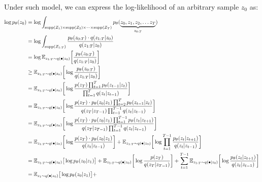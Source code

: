 Under such model, we can express the log-likelihood of an arbitrary sample \( z_0 \) as:
\begin{align}
    \log p_\theta (z_0) &= \log \int_{\supp{Z_1} \times \supp{Z_2} \times \dots \times \supp{Z_T}} p_\theta(\underbrace{z_0, z_1, z_2, \dots z_T}_{z_{0:T}}) \\
    &= \log \int_{\supp{Z_{1:T}}} \frac{p_\theta(z_{0:T}) \cdot q(z_{1:T} \vert z_0)}{q(z_{1:T} \vert z_0)} \label{eq:diffusion-1} \\
    &= \log \mathbb{E}_{z_{1:T} \sim q(\bullet \vert z_0)} \bigg[ \frac{p_\theta(z_{0:T})}{q(z_{1:T} \vert z_0)} \bigg] \\
    &\geq \mathbb{E}_{z_{1:T} \sim q(\bullet \vert z_0)} \bigg[ \log \frac{p_\theta(z_{0:T})}{q(z_{1:T} \vert z_0)} \bigg] \label{eq:diffusion-jensen} \\
    &= \mathbb{E}_{z_{1:T} \sim q(\bullet \vert z_0)} \bigg[ \log \frac{p(z_T) \prod_{t=1}^{T} p_\theta (z_{t-1} \vert z_t)}{\prod_{t=1}^T q(z_t \vert z_{t-1})} \bigg] \label{eq:diffusion-2} \\
    &= \mathbb{E}_{z_{1:T} \sim q(\bullet \vert z_0)} \bigg[ \log \frac{p(z_T) \cdot p_\theta (z_0 \vert z_1) \prod_{t=2}^{T} p_\theta (z_{t-1} \vert z_t)}{q(z_T \vert z_{T-1}) \prod_{t=1}^{T-1} q(z_t \vert z_{t-1})} \bigg] \label{eq:diffusion-3} \\
    &= \mathbb{E}_{z_{1:T} \sim q(\bullet \vert z_0)} \bigg[ \log \frac{p(z_T) \cdot p_\theta (z_0 \vert z_1) \prod_{t=1}^{T-1} p_\theta (z_{t} \vert z_{t+1})}{q(z_T \vert z_{T-1}) \prod_{t=1}^{T-1} q(z_t \vert z_{t-1})} \bigg] \label{eq:diffusion-4} \\
    &= 
        \mathbb{E}_{z_{1:T} \sim q(\bullet \vert z_0)} \bigg[ \log \frac{p(z_T) \cdot p_\theta (z_0 \vert z_1)}{q(z_t \vert z_{t-1})} \bigg] + 
        \mathbb{E}_{z_{1:T} \sim q(\bullet \vert z_0)} \bigg[ \log \prod_{t=1}^{T-1} \frac{p_\theta (z_{t} \vert z_{t+1})}{q(z_t \vert z_{t-1})}\bigg]
    \label{eq:diffusion-5} \\
    &=
        \mathbb{E}_{z_{1:T} \sim q(\bullet \vert z_0)} \big[ \log  p_\theta (z_0 \vert z_1) \big] + 
        \mathbb{E}_{z_{1:T} \sim q(\bullet \vert z_0)} \bigg[ \log \frac{p (z_T)}{q(z_T \vert z_{T-1})} \bigg] +
        \sum_{t=1}^{T-1} \mathbb{E}_{z_{1:T} \sim q(\bullet \vert z_0)} \bigg[ \log \frac{p_\theta (z_{t} \vert z_{t+1})}{q(z_t \vert z_{t-1})}\bigg]
    \label{eq:diffusion-6} \\
    &= 
        \mathbb{E}_{z_1 \sim q(\bullet \vert z_0)} \big[ \log  p_\theta (z_0 \vert z_1) \big] + 

\end{align}
